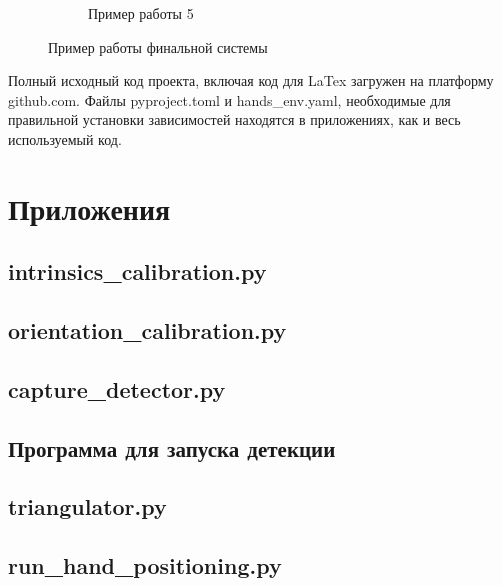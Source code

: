 \documentclass[12pt, a4paper]{article}
\begin{document}
\begin{figure}[!ht]
\begin{subfigure}{0.45\textwidth}
      \caption{Пример работы 5}
    \end{subfigure}
\caption{Пример работы финальной системы}
\label{fig:final_version_working}
\end{figure}


Полный исходный код проекта, включая код для LaTex загружен на платформу
\\github.com\cite{mycode-github}. Файлы pyproject.toml и hands\_env.yaml,
необходимые для правильной установки зависимостей находятся в приложениях, как
и весь используемый код.

\section{Приложения}
\subsection{intrinsics\_calibration.py}



\subsection{orientation\_calibration.py}
 

\subsection{capture\_detector.py}

\subsection{Программа для запуска детекции}


\subsection{triangulator.py}


\subsection{run\_hand\_positioning.py}

\end{document}
